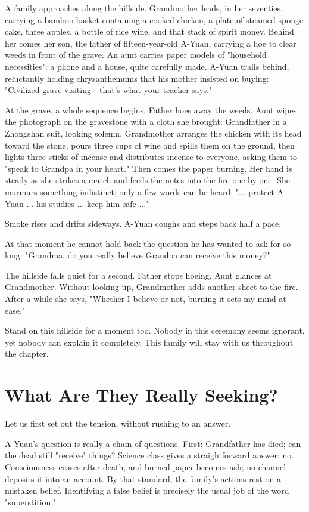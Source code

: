 A family approaches along the hillside. Grandmother leads, in her seventies, carrying a bamboo basket containing a cooked chicken, a plate of steamed sponge cake, three apples, a bottle of rice wine, and that stack of spirit money. Behind her comes her son, the father of fifteen-year-old A-Yuan, carrying a hoe to clear weeds in front of the grave. An aunt carries paper models of "household necessities": a phone and a house, quite carefully made. A-Yuan trails behind, reluctantly holding chrysanthemums that his mother insisted on buying: "Civilized grave-visiting---that's what your teacher says."

At the grave, a whole sequence begins. Father hoes away the weeds. Aunt wipes the photograph on the gravestone with a cloth she brought: Grandfather in a Zhongshan suit, looking solemn. Grandmother arranges the chicken with its head toward the stone, pours three cups of wine and spills them on the ground, then lights three sticks of incense and distributes incense to everyone, asking them to "speak to Grandpa in your heart." Then comes the paper burning. Her hand is steady as she strikes a match and feeds the notes into the fire one by one. She murmurs something indistinct; only a few words can be heard: "... protect A-Yuan ... his studies ... keep him safe ..."

Smoke rises and drifts sideways. A-Yuan coughs and steps back half a pace.

At that moment he cannot hold back the question he has wanted to ask for so long: "Grandma, do you really believe Grandpa can receive this money?"

The hillside falls quiet for a second. Father stops hoeing. Aunt glances at Grandmother. Without looking up, Grandmother adds another sheet to the fire. After a while she says, "Whether I believe or not, burning it sets my mind at ease."

Stand on this hillside for a moment too. Nobody in this ceremony seems ignorant, yet nobody can explain it completely. This family will stay with us throughout the chapter.

\section{What Are They Really Seeking?}
Let us first set out the tension, without rushing to an answer.

A-Yuan's question is really a chain of questions. First: Grandfather has died; can the dead still "receive" things? Science class gives a straightforward answer: no. Consciousness ceases after death, and burned paper becomes ash; no channel deposits it into an account. By that standard, the family's actions rest on a mistaken belief. Identifying a false belief is precisely the usual job of the word "superstition."

